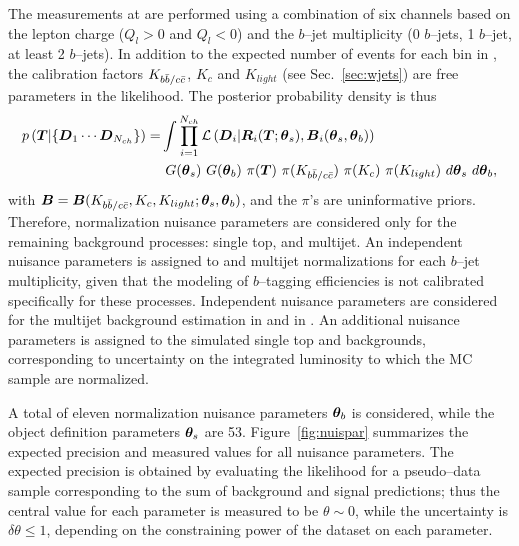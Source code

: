 The measurements at \eighttev{}  are
performed using a combination of six channels based on
the lepton charge ($Q_l>0$ and $Q_l<0$) and the $b$--jet multiplicity
(0 $b$--jets, 1 $b$--jet, at least 2 $b$--jets). In addition to the
expected number of \ttbar{} events for each bin in \Truth{}, the
\wjets{} calibration factors $K_{b\bar{b}{}/c\bar{c}{}}$, $K_c$ and
$K_{light}$ (see Sec.~\ref{sec:wjets}) are free parameters in the likelihood.
The posterior probability density is thus
\begin{equation}
\begin{split}
  p\left(\boldsymbol{T}{}|\{\boldsymbol{D}{}_1\cdots{}\boldsymbol{D}{}_{N_{ch}}\}\right)=&
  \int
  \prod_{i=1}^{N_{ch}}\mathcal{L}\left(\boldsymbol{D}{}_i|\boldsymbol{R}{}_i(\boldsymbol{T}{};\boldsymbol{\theta}{}_s),\boldsymbol{B}{}_i(\boldsymbol{\theta}{}_s,\boldsymbol{\theta}{}_b)\right)  \\
&  ~G(\boldsymbol{\theta}{}_s)
  ~G(\boldsymbol{\theta}{}_b)
  ~\pi{}(\boldsymbol{T}{})
  ~\pi{}(K_{b\bar{b}{}/c\bar{c}{}})
  ~\pi{}(K_c)
  ~\pi{}(K_{light})
  ~d\boldsymbol{\theta}{}_s
  ~d\boldsymbol{\theta}{}_b,\\
\end{split}
\end{equation}
with
$\boldsymbol{B}{}=\boldsymbol{B}{}(K_{b\bar{b}{}/c\bar{c}{}},K_c,K_{light};\boldsymbol{\theta}_s,\boldsymbol{\theta}{}_b)$,
and the $\pi{}$'s are uninformative priors.
Therefore, normalization nuisance parameters are considered
only for the remaining background processes: single top, \zjets{} and
multijet. An independent nuisance parameters is assigned to \zjets{}
and multijet normalizations for each $b$--jet multiplicity, given that
the modeling of $b$--tagging efficiencies is not calibrated
specifically for these processes. Independent nuisance parameters are
considered for the multijet background estimation in \mujets{} and in
\ejets{}. An additional nuisance parameters is
assigned to the simulated single top and \zjets{} backgrounds,
corresponding to uncertainty on the integrated luminosity to which the
MC sample are normalized.

A total of eleven normalization nuisance parameters $\boldsymbol{\theta}_b$ is
considered, while the object definition parameters $\boldsymbol{\theta}_s$ are 53. 
Figure~\ref{fig:nuispar} summarizes the expected precision and measured
values for all nuisance parameters. The expected precision is obtained
by evaluating the likelihood for a pseudo--data sample corresponding
to the sum of background and signal predictions; thus the central
value for each parameter is measured to be $\theta\sim0$, while the
uncertainty is $\delta\theta\leq1$, depending on the constraining power of
the dataset on each parameter.

